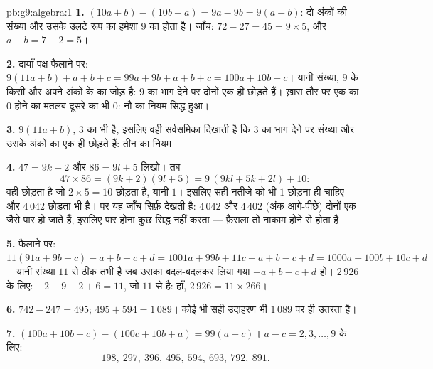 \begin{solution}{pb:g9:algebra:1}
\textbf{1.} $(10a + b) - (10b + a) = 9a - 9b = 9(a - b)$: दो अंकों
की संख्या और उसके उलटे रूप का  हमेशा $9$ का  होता है। जाँच:
$72 - 27 = 45 = 9 \times 5$, और $a - b = 7 - 2 = 5$।

\textbf{2.} दायाँ पक्ष फैलाने पर:
$9(11a + b) + a + b + c = 99a + 9b + a + b + c
= 100a + 10b + c$। यानी संख्या, $9$ के किसी  और अपने अंकों के
 का जोड़ है: $9$ का भाग देने पर दोनों एक ही  छोड़ते हैं।
ख़ास तौर पर एक का  $0$ होने का मतलब दूसरे का भी  $0$: नौ
का नियम सिद्ध हुआ।

\textbf{3.} $9(11a + b)$, $3$ का भी  है, इसलिए वही सर्वसमिका
दिखाती है कि $3$ का भाग देने पर संख्या और उसके अंकों का  एक ही
 छोड़ते हैं: तीन का नियम।

\textbf{4.} $47 = 9k + 2$ और $86 = 9l + 5$ लिखो। तब
\[
47 \times 86 = (9k + 2)(9l + 5)
= 9\,(9kl + 5k + 2l) + 10 :
\]
 वही  छोड़ता है जो $2 \times 5 = 10$ छोड़ता है, यानी $1$।
इसलिए सही नतीजे को भी  $1$ छोड़ना ही चाहिए --- और $4\,042$
छोड़ता भी है। पर यह जाँच सिर्फ़  देखती है: $4\,042$ और $4\,402$
(अंक आगे-पीछे) दोनों एक जैसे पार हो जाते हैं, इसलिए पार होना कुछ
सिद्ध नहीं करता --- फ़ैसला तो नाकाम होने से होता है।

\textbf{5.} फैलाने पर: $11(91a + 9b + c) - a + b - c + d
= 1001a + 99b + 11c - a + b - c + d
= 1000a + 100b + 10c + d$। यानी संख्या $11$ से  ठीक तभी है जब
उसका बदल-बदलकर लिया गया  $-a + b - c + d$  हो। $2\,926$
के लिए: $-2 + 9 - 2 + 6 = 11$, जो $11$ से  है: हाँ,
$2\,926 = 11 \times 266$।

\textbf{6.} $742 - 247 = 495$; $495 + 594 = 1\,089$। कोई भी सही
उदाहरण भी $1\,089$ पर ही उतरता है।

\textbf{7.} $(100a + 10b + c) - (100c + 10b + a) = 99(a - c)$।
$a - c = 2, 3, \dots, 9$ के लिए:
\[
198,\ 297,\ 396,\ 495,\ 594,\ 693,\ 792,\ 891 .
\]


\end{solution}
